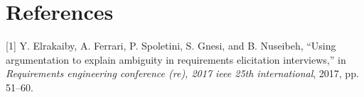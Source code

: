 \documentclass[]{llncs}
\begin{document}
\newpage

\hypertarget{references}{%
\section*{References}\label{references}}

\hypertarget{refs}{}
\leavevmode\hypertarget{ref-elrakaiby2017using}{}%
{[}1{]} Y. Elrakaiby, A. Ferrari, P. Spoletini, S. Gnesi, and B.
Nuseibeh, ``Using argumentation to explain ambiguity in requirements
elicitation interviews,'' in \emph{Requirements engineering conference
(re), 2017 ieee 25th international}, 2017, pp. 51--60.
\end{document}
